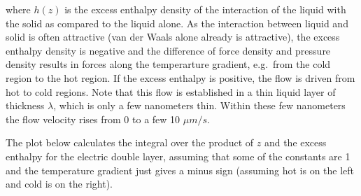 \documentclass[letterpaper,10pt,english]{sphinxmanual}
\begin{document}
\sphinxAtStartPar
where \(h(z)\) is the excess enthalpy density of the interaction of the liquid with the solid as compared to the liquid alone. As the interaction between liquid and solid is often attractive (van der Waals alone already is attractive), the excess enthalpy density is negative and the difference of force density and pressure density results in forces along the temperarture gradient, e.g. from the cold region to the hot region. If the excess enthalpy is positive, the flow is driven from hot to
cold regions. Note that this flow is established in a thin liquid layer of thickness \(\lambda\), which is only a few nanometers thin. Within these few nanometers the flow velocity rises from 0 to a few 10 \(\mu m/s\).

\sphinxAtStartPar
The plot below calculates the integral over the product of \(z\) and the excess enthalpy for the electric double layer, assuming that some of the constants are 1 and the temperature gradient just gives a minus sign (assuming hot is on the left and cold is on the right).
\end{document}

